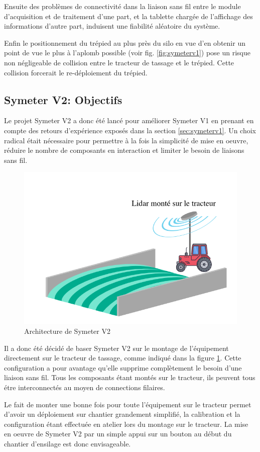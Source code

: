 \documentclass[12pt,a4paper]{report}
\begin{document}
		\para Ensuite des problèmes de connectivité dans la liaison sans fil entre le module d'acquisition et de traitement d'une part, et la tablette chargée de l'affichage des informations d'autre part, induisent une fiabilité aléatoire du système.
		
		\para Enfin le positionnement du trépied au plus près du silo en vue d'en obtenir un point de vue le plus à l'aplomb possible (voir fig. \ref{fig:symeterv1}) pose un risque non négligeable de collision entre le tracteur de tassage et le trépied. Cette collision forcerait le re-déploiement du trépied.
		

		\subsection{Symeter V2: Objectifs}
		Le projet Symeter V2 a donc été lancé pour améliorer Symeter V1 en prenant en compte des retours d'expérience exposés dans la section \ref{sec:symeterv1}. Un choix radical était nécessaire pour permettre à la fois la simplicité de mise en oeuvre, réduire le nombre de composants en interaction et limiter le besoin de liaisons sans fil. 
		
		\begin{figure}[h!]
			\centering
			\includegraphics[width=0.6\linewidth]{img/LidarMobile}
			\caption[archiv2]{Architecture de Symeter V2}
			\label{fig:lidarmobile}
		\end{figure}
		
		\para Il a donc été décidé de baser Symeter V2 sur le montage de l'équipement directement sur le tracteur de tassage, comme indiqué dans la figure \ref{fig:lidarmobile}. Cette configuration a pour avantage qu'elle supprime complètement le besoin d'une liaison sans fil. Tous les composants étant montés sur le tracteur, ils peuvent tous étre interconnectés au moyen de connections filaires.
		
		\para Le fait de monter une bonne fois pour toute l'équipement sur le tracteur permet d'avoir un déploiement sur chantier grandement simplifié, la calibration et la configuration étant effectuée en atelier lors du montage sur le tracteur. La mise en oeuvre de Symeter V2 par un simple appui sur un bouton au début du chantier d'ensilage est donc envisageable.
		
\end{document}
